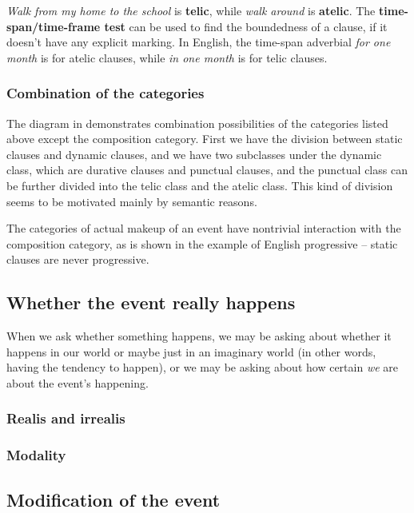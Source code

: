 \documentclass[UTF8, a4paper, oneside, scheme=plain]{ctexart}
\newcommand*{\citepage}[1]{pp.~{#1}}
\newcommand*{\concept}[1]{\textbf{#1}}
\newcommand*{\corpus}[1]{\emph{#1}}
\begin{document}
\corpus{Walk from my home to the school} is \concept{telic},
while \corpus{walk around} is \concept{atelic}.
The \concept{time-span/time-frame test} can be used to find the boundedness of a clause,
if it doesn't have any explicit marking.
In English, the time-span adverbial \corpus{for one month} is for atelic clauses,
while \corpus{in one month} is for telic clauses.

\subsubsection{Combination of the categories}

The diagram in \citet[\citepage{128}]{cgel} demonstrates combination possibilities of the categories listed above 
except the composition category.
First we have the division between static clauses and dynamic clauses,
and we have two subclasses under the dynamic class,
which are durative clauses and punctual clauses,
and the punctual class can be further divided into the telic class and the atelic class.
This kind of division seems to be motivated mainly by semantic reasons.

The categories of actual makeup of an event have nontrivial interaction with the composition category,
as is shown in the example of English progressive -- 
static clauses are never progressive.

\subsection{Whether the event really happens}

When we ask whether something happens,
we may be asking about whether it happens in our world 
or maybe just in an imaginary world (in other words, having the tendency to happen),
or we may be asking about how certain \emph{we} are about the event's happening.

\subsubsection{Realis and irrealis}\label{sec:irrealis}

\subsubsection{Modality}

\subsection{Modification of the event}
\end{document}
